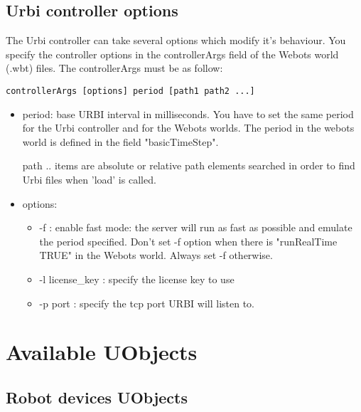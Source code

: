 \subsection{Urbi controller options}
\label{webots.own.controlleroptions}%

 The Urbi controller can take several options which modify it's behaviour.
You specify the controller options in the controllerArgs field of the Webots
world (.wbt) files.
 The controllerArgs must be as follow:

\begin{lstlisting}
controllerArgs [options] period [path1 path2 ...]
\end{lstlisting}
\begin{itemize}

\item period: base URBI interval in milliseconds. You have to set the
  same period for the Urbi controller and for the Webots worlds. The
  period in the webots world is defined in the field "basicTimeStep".


\item [path ..] items are absolute or relative path elements searched
  in order to find Urbi files when 'load' is called.


\item options:
  \begin{itemize}

  \item -{}f : enable fast mode: the server will run as fast as
    possible and emulate the period specified.  Don't set -{}f option
    when there is "runRealTime TRUE" in the Webots world.  Always set
    -{}f otherwise.


  \item -{}l license\_key : specify the license key to use


  \item -{}p port : specify the tcp port URBI will listen to.

  \end{itemize}

\end{itemize}



\section{Available UObjects}
\label{webots.uobjects}%

\subsection{Robot devices UObjects}
\label{webots.uobjects.robotdevices}%

